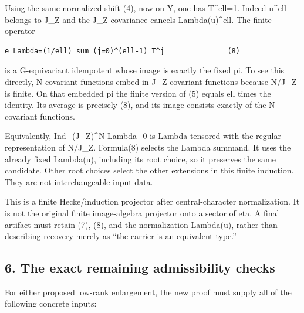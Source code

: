 Using the same normalized shift (4), now on Y, one has T\^{}ell=1.
Indeed u\^{}ell belongs to J\_Z and the J\_Z covariance cancels
Lambda(u)\^{}ell. The finite operator

\begin{Verbatim}[fontsize=\small,breaklines=true,breakanywhere=true]
e_Lambda=(1/ell) sum_(j=0)^(ell-1) T^j               (8)
\end{Verbatim}

is a G-equivariant idempotent whose image is exactly the fixed pi. To
see this directly, N-covariant functions embed in J\_Z-covariant
functions because N/J\_Z is finite. On that embedded pi the finite
version of (5) equals ell times the identity. Its average is precisely
(8), and its image consists exactly of the N-covariant functions.

Equivalently, Ind\_(J\_Z)\^{}N Lambda\_0 is Lambda tensored with the
regular representation of N/J\_Z. Formula(8) selects the Lambda summand.
It uses the already fixed Lambda(u), including its root choice, so it
preserves the same candidate. Other root choices select the other
extensions in this finite induction. They are not interchangeable input
data.

This is a finite Hecke/induction projector after central-character
normalization. It is not the original finite image-algebra projector
onto a sector of eta. A final artifact must retain (7), (8), and the
normalization Lambda(u), rather than describing recovery merely as ``the
carrier is an equivalent type.''

\hypertarget{lowrank_contract-the-exact-remaining-admissibility-checks}{%
\subsection{6. The exact remaining admissibility
checks}\label{lowrank_contract-the-exact-remaining-admissibility-checks}}

For either proposed low-rank enlargement, the new proof must supply all
of the following concrete inputs:

